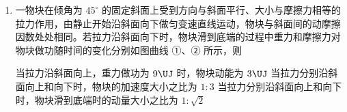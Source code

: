 \documentclass[\gkver]{gaokaozhenti}
\begin{document}
\begin{enumerate}
{故 C 错误；

D．根据万有引力提供向心力，有

$G\frac{Mm}{\left(\frac{17}{16}R\right)^{2}} = ma$

则空间站绕地球运动的向心加速度大小为

$a = \frac{GM}{\left(\frac{17}{16}R\right)^{2}}$

地表的重力加速度为

$g = \frac{GM}{R^{2}}$，可得 $\frac{a}{g} = \left(\frac{16}{17}\right)^{2}$

即空间站绕地球运动的向心加速度大小约为地面重力加速度的 $\left(\frac{16}{17}\right)^{2}$ 倍，故 D 正确。

故选 BD。
}

\item
一物块在倾角为 $45^\circ$ 的固定斜面上受到方向与斜面平行、大小与摩擦力相等的拉力作用，由静止开始沿斜面向下做匀变速直线运动，物块与斜面间的动摩擦因数处处相同。若拉力沿斜面向下时，物块滑到底端的过程中重力和摩擦力对物块做功随时间的变化分别如图曲线 ①、② 所示，则


{当拉力沿斜面向上，重力做功为 $9\UJ$ 时，物块动能为 $3\UJ$}
{当拉力分别沿斜面向上和向下时，物块的加速度大小之比为 $1:3$}
{当拉力分别沿斜面向上和向下时，物块滑到底端时的动量大小之比为 $1:\sqrt 2$}

\end{enumerate}
\end{document}
